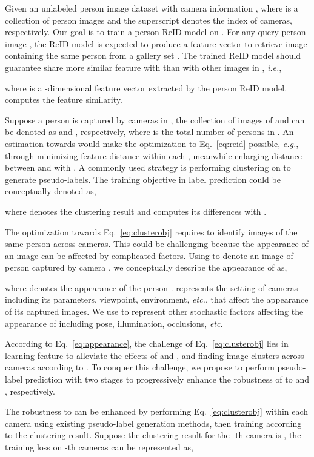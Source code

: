 \documentclass[final]{cvpr}
\begin{document}
Given an unlabeled person image dataset with camera information , where  is a collection of person images and the superscript  denotes the index of cameras, respectively. Our goal is to train a person ReID model on . For any query person image , the ReID model is expected to produce a feature vector to retrieve image  containing the same person from a gallery set . The trained ReID model should guarantee  share more similar feature with  than with other images in , \emph{i.e.},

where  is a -dimensional feature vector extracted by the person ReID model.  computes the feature similarity.


Suppose a person  is captured by cameras in , the collection of images of  and  can be denoted as  and , respectively, where  is the total number of persons in . An estimation towards  would make the optimization to Eq.~\eqref{eq:reid} possible, \emph{e.g.}, through minimizing feature distance within each , meanwhile enlarging distance between  and  with . A commonly used strategy is performing clustering on  to generate pseudo-labels. The training objective in label prediction could be conceptually denoted as,

where  denotes the clustering result and  computes its differences with .

The optimization towards Eq.~\eqref{eq:clusterobj} requires to identify images of the same person across cameras. This could be challenging because the appearance of an image can be affected by complicated factors. Using  to denote an image of person  captured by camera , we conceptually describe the appearance of  as,

where  denotes the appearance of the person .  represents the setting of cameras  including its parameters, viewpoint, environment, \emph{etc.}, that affect the appearance of its captured images. We use  to represent other stochastic factors affecting the appearance of  including pose, illumination, occlusions, \emph{etc}.

According to Eq.~\eqref{eq:appearance}, the challenge of Eq.~\eqref{eq:clusterobj} lies in learning feature  to alleviate the effects of  and , and finding image clusters across cameras according to . To conquer this challenge, we propose to perform pseudo-label prediction with two stages to progressively enhance the robustness of  to  and , respectively.

The robustness to  can be enhanced by performing Eq.~\eqref{eq:clusterobj} within each camera using existing pseudo-label generation methods, then training  according to the clustering result. Suppose the clustering result for the -th camera is , the training loss on -th cameras can be represented as,
\end{document}
